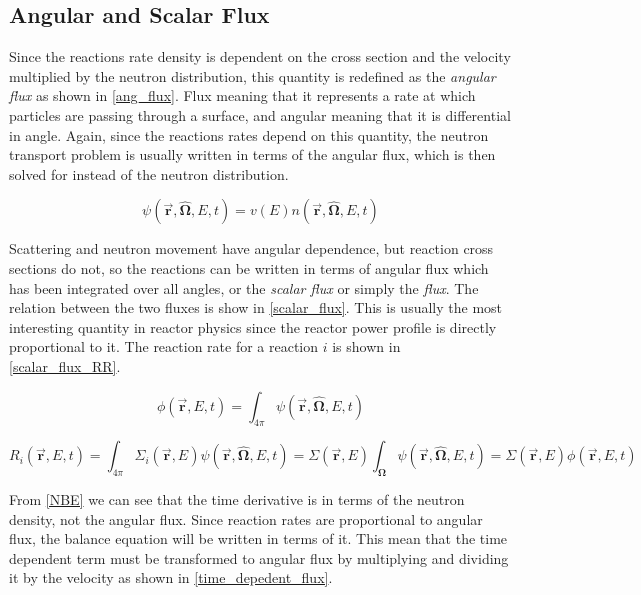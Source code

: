 \subsection{Angular and Scalar Flux}

Since the reactions rate density is dependent on the cross section and the velocity multiplied by the neutron distribution, this quantity is redefined as the \emph{angular flux} as shown in \eqref{ang_flux}.  Flux meaning that it represents a rate at which particles are passing through a surface, and angular meaning that it is differential in angle.  Again, since the reactions rates depend on this quantity, the neutron transport problem is usually written in terms of the angular flux, which is then solved for instead of the neutron distribution.

\begin{equation}
\label{ang_flux}
\psi(\boldsymbol{\vec{r}},\boldsymbol{\hat{\Omega}},E,t) = v(E) n(\boldsymbol{\vec{r}},\boldsymbol{\hat{\Omega}},E,t)
\end{equation}

Scattering and neutron movement have angular dependence, but reaction cross sections do not, so the reactions can be written in terms of angular flux which has been integrated over all angles, or the \emph{scalar flux} or simply the \emph{flux}.  The relation between the two fluxes is show in \eqref{scalar_flux}.  This is usually the most interesting quantity in reactor physics since the reactor power profile is directly proportional to it.  The reaction rate for a reaction $i$ is shown in \eqref{scalar_flux_RR}.

\begin{equation}
\label{scalar_flux}
\phi(\boldsymbol{\vec{r}},E,t) = \int_{4\pi} \psi(\boldsymbol{\vec{r}},\boldsymbol{\hat{\Omega}},E,t)
\end{equation}

\begin{equation}
\label{scalar_flux_RR}
 R_i(\boldsymbol{\vec{r}},E,t) = \int_{4\pi} \Sigma_i(\boldsymbol{\vec{r}},E) \psi(\boldsymbol{\vec{r}},\boldsymbol{\hat{\Omega}},E,t) = \Sigma(\boldsymbol{\vec{r}},E) \int_{\boldsymbol{\Omega}} \psi(\boldsymbol{\vec{r}},\boldsymbol{\hat{\Omega}},E,t) = \Sigma(\boldsymbol{\vec{r}},E) \phi(\boldsymbol{\vec{r}},E,t)
 \end{equation}
 
 From \eqref{NBE} we can see that the time derivative is in terms of the neutron density, not the angular flux.  Since reaction rates are proportional to angular flux, the balance equation will be written in terms of it.  This mean that the time dependent term must be transformed to angular flux by multiplying and dividing it by the velocity as shown in \eqref{time_depedent_flux}.

